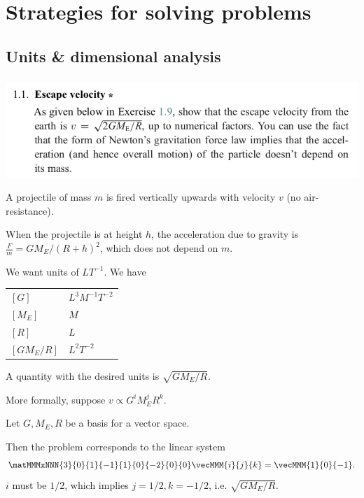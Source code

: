 

\section{Strategies for solving problems}
\subsection*{Units \& dimensional analysis}
\subsubsection*{}
\begin{mdframed}
  \includegraphics[width=400pt]{img/physics--classical-mechanics--morin--1-1.png}
\end{mdframed}

A projectile of mass $m$ is fired vertically upwards with velocity $v$ (no air-resistance).

When the projectile is at height $h$, the acceleration due to gravity is
$\frac{F}{m} = GM_E/(R + h)^2$, which does not depend on $m$.

We want units of $LT^{-1}$. We have

\begin{tabular*}{1.0\linewidth}{l|l}
  $[G]$        & $L^3M^{-1}T^{-2}$ \\
  $[M_E]$      & $M$ \\
  $[R]$        & $L$ \\
  $[GM_E / R]$ & $L^2T^{-2}$
\end{tabular*}

A quantity with the desired units is $\sqrt{GM_E/R}$.

More formally, suppose $v \propto G^iM_E^jR^k$.

Let  ${G, M_E, R}$ be a basis for a vector space.

Then the problem corresponds to the linear system
\begin{align*}
  \matMMMxNNN
  {3}{0}{1}
  {-1}{1}{0}
  {-2}{0}{0} \vecMMM{i}{j}{k} = \vecMMM{1}{0}{-1}.
\end{align*}
$i$ must be $1/2$, which implies $j = 1/2, k = -1/2$, i.e. $\sqrt{GM_E/R}$. \checkmark

